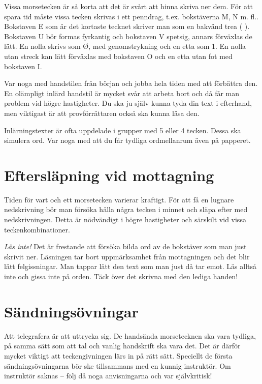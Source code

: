 Vissa morsetecken är så korta att det är svårt att hinna skriva ner dem.
För att spara tid måste vissa tecken skrivas i ett penndrag, t.ex. bokstäverna
M, N m. fl..
Bokstaven E som är det kortaste tecknet skriver man som en bakvänd trea
(  ).
Bokstaven U bör formas fyrkantig och bokstaven V spetsig, annars förväxlas de
lätt.
En nolla skrivs som Ø, med genomstrykning och en etta som 1.
En nolla utan streck kan lätt förväxlas med bokstaven O och en etta utan fot med
bokstaven I.

Var noga med handstilen från början och jobba hela tiden med att förbättra den.
En olämpligt inlärd handstil är mycket svår att arbeta bort och då får man
problem vid högre hastigheter.
Du ska ju själv kunna tyda din text i efterhand, men viktigast är att
provförrättaren också ska kunna läsa den.

Inlärningstexter är ofta uppdelade i grupper med 5 eller 4 tecken.
Dessa ska simulera ord.
Var noga med att du får tydliga ordmellanrum även på papperet.

\section[Eftersläpning]{Eftersläpning vid mottagning}

Tiden för vart och ett morsetecken varierar kraftigt.
För att få en lugnare nedskrivning bör man försöka hålla några tecken i minnet
och släpa efter med nedskrivningen.
Detta är nödvändigt i högre hastigheter och särskilt vid vissa
teckenkombinationer.

\emph{Läs inte!}
Det är frestande att försöka bilda ord av de bokstäver som man just skrivit ner.
Läsningen tar bort uppmärksamhet från mottagningen och det blir lätt
felgissningar.
Man tappar lätt den text som man just då tar emot.
Läs alltså inte och gissa inte på orden.
Täck över det skrivna med den lediga handen!

\section{Sändningsövningar}

Att telegrafera är att uttrycka sig.
De handsända morsetecknen ska vara tydliga, på samma sätt som att tal och
vanlig handskrift ska vara det.
Det är därför mycket viktigt att teckengivningen lärs in på rätt sätt.
Speciellt de första sändningsövningarna bör ske tillsammans med en kunnig
instruktör.
Om instruktör saknas -- följ då noga anvisningarna och var självkritisk!

